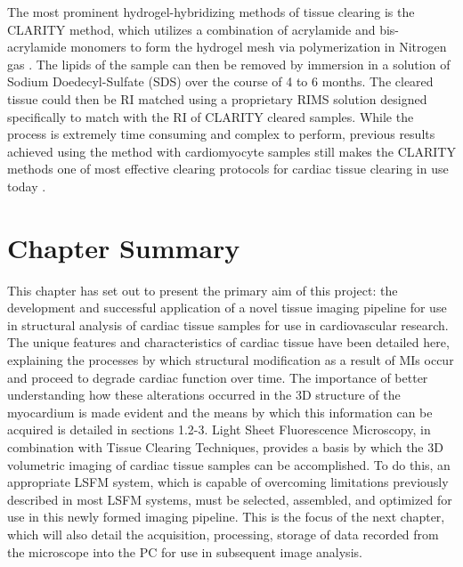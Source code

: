 The most prominent hydrogel-hybridizing methods of tissue clearing is the CLARITY method, which utilizes a combination of acrylamide and bis-acrylamide monomers to form the hydrogel mesh via polymerization in Nitrogen gas . The lipids of the sample can then be removed by immersion in a solution of Sodium Doedecyl-Sulfate (SDS) over the course of 4 to 6 months\cite{olianti_optical_2021}. The cleared tissue could then be RI matched using a proprietary RIMS solution designed specifically to match with the RI of CLARITY cleared samples.  While the process is extremely time consuming and complex to perform, previous results achieved using the method with cardiomyocyte samples still makes the CLARITY methods one of most effective clearing protocols for cardiac tissue clearing in use today \cite{paysan_art_2023,olianti_optical_2021}. 

\section{Chapter Summary}

This chapter has set out to present the primary aim of this project: the development and successful application of a novel tissue imaging pipeline for use in structural analysis of cardiac tissue samples for use in cardiovascular research. The unique features and characteristics of cardiac tissue have been detailed here, explaining the processes by which structural modification as a result of MIs occur and proceed to degrade cardiac function over time. The importance of better understanding how these alterations occurred in the 3D structure of the myocardium is made evident and the means by which this information can be acquired is detailed in sections 1.2-3. Light Sheet Fluorescence Microscopy, in combination with Tissue Clearing Techniques, provides a basis by which the 3D volumetric imaging of cardiac tissue samples can be accomplished. To do this, an appropriate LSFM system, which is capable of overcoming limitations previously described in most LSFM systems, must be selected, assembled, and optimized for use in this newly formed imaging pipeline. This is the focus of the next chapter, which will also detail the acquisition, processing, storage of data recorded from the microscope into the PC for use in subsequent image analysis. 


